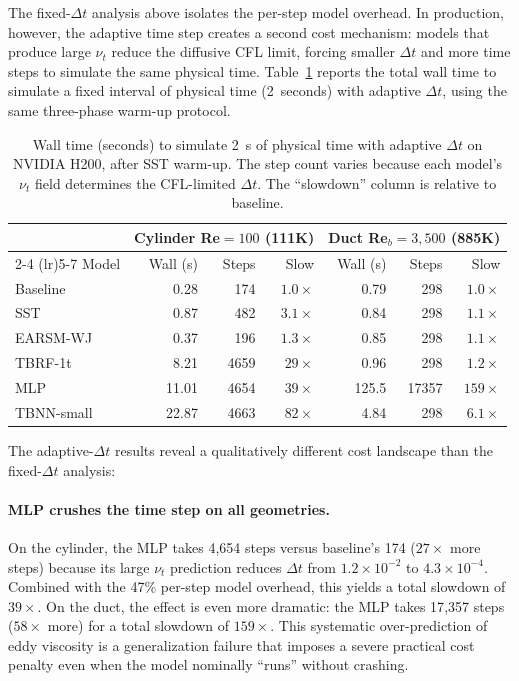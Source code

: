 The fixed-$\Delta t$ analysis above isolates the per-step model overhead.
In production, however, the adaptive time step creates a second cost mechanism: models that produce large $\nu_t$ reduce the diffusive CFL limit, forcing smaller $\Delta t$ and more time steps to simulate the same physical time.
Table~\ref{tab:wall_time} reports the total wall time to simulate a fixed interval of physical time (2~seconds) with adaptive $\Delta t$, using the same three-phase warm-up protocol.

\begin{table}[htbp]
\centering
\caption{Wall time (seconds) to simulate 2~s of physical time with adaptive $\Delta t$ on NVIDIA H200, after SST warm-up. The step count varies because each model's $\nu_t$ field determines the CFL-limited $\Delta t$. The ``slowdown'' column is relative to baseline.}
\label{tab:wall_time}
\begin{tabular}{lrrrrrr}
\toprule
& \multicolumn{3}{c}{Cylinder Re$=100$ (111K)} & \multicolumn{3}{c}{Duct Re$_b=3{,}500$ (885K)} \\
\cmidrule(lr){2-4} \cmidrule(lr){5-7}
Model & Wall (s) & Steps & Slow & Wall (s) & Steps & Slow \\
\midrule
Baseline      & 0.28  & 174   & $1.0\times$  & 0.79  & 298   & $1.0\times$ \\
SST           & 0.87  & 482   & $3.1\times$  & 0.84  & 298   & $1.1\times$ \\
EARSM-WJ     & 0.37  & 196   & $1.3\times$  & 0.85  & 298   & $1.1\times$ \\
TBRF-1t       & 8.21  & 4659  & $29\times$   & 0.96  & 298   & $1.2\times$ \\
MLP           & 11.01 & 4654  & $39\times$   & 125.5 & 17357 & $159\times$ \\
TBNN-small    & 22.87 & 4663  & $82\times$   & 4.84  & 298   & $6.1\times$ \\
\bottomrule
\end{tabular}
\end{table}

The adaptive-$\Delta t$ results reveal a qualitatively different cost landscape than the fixed-$\Delta t$ analysis:

\paragraph{MLP crushes the time step on all geometries.}
On the cylinder, the MLP takes 4{,}654 steps versus baseline's 174 ($27\times$ more steps) because its large $\nu_t$ prediction reduces $\Delta t$ from $1.2 \times 10^{-2}$ to $4.3 \times 10^{-4}$.
Combined with the 47\% per-step model overhead, this yields a total slowdown of $39\times$.
On the duct, the effect is even more dramatic: the MLP takes 17{,}357 steps ($58\times$ more) for a total slowdown of $159\times$.
This systematic over-prediction of eddy viscosity is a generalization failure that imposes a severe practical cost penalty even when the model nominally ``runs'' without crashing.

